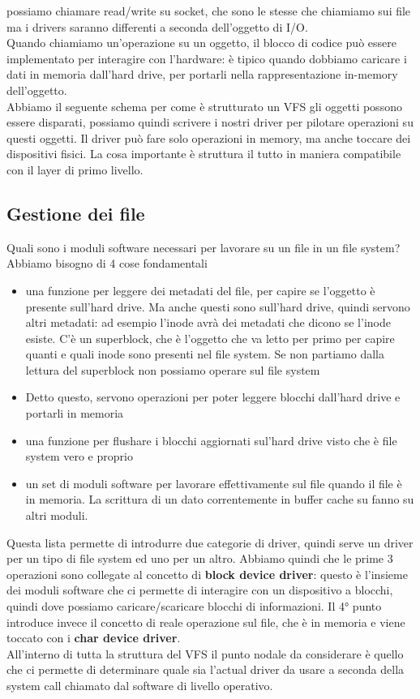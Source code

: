 \documentclass[12pt, oneside]{extbook}
\begin{document}
possiamo chiamare read/write su socket, che sono le stesse che chiamiamo sui file ma i drivers saranno differenti a seconda dell'oggetto di I/O.\\Quando chiamiamo un'operazione su un oggetto, il blocco di codice può essere implementato per interagire con l'hardware: è tipico quando dobbiamo caricare i dati in memoria dall'hard drive, per portarli nella rappresentazione in-memory dell'oggetto.\\Abbiamo il seguente schema per come è strutturato un VFS 
gli oggetti possono essere disparati, possiamo quindi scrivere i nostri driver per pilotare operazioni su questi oggetti. Il driver può fare solo operazioni in memory, ma anche toccare dei dispositivi fisici. La cosa importante è struttura il tutto in maniera compatibile con il layer di primo livello.
\subsection{Gestione dei file}
Quali sono i moduli software necessari per lavorare su un file in un file system? Abbiamo bisogno di 4 cose fondamentali
\begin{itemize}
\item una funzione per leggere dei metadati del file, per capire se l'oggetto è presente sull'hard drive. Ma anche questi sono sull'hard drive, quindi servono altri metadati: ad esempio l'inode avrà dei metadati che dicono se l'inode esiste. C'è un superblock, che è l'oggetto che va letto per primo per capire quanti e quali inode sono presenti nel file system. Se non partiamo dalla lettura del superblock non possiamo operare sul file system
\item Detto questo, servono operazioni per poter leggere blocchi dall'hard drive e portarli in memoria
\item una funzione per flushare i blocchi aggiornati sul'hard drive visto che è file system vero e proprio
\item un set di moduli software per lavorare effettivamente sul file quando il file è in memoria. La scrittura di un dato correntemente in buffer cache su fanno su altri moduli.
\end{itemize}
Questa lista permette di introdurre due categorie di driver, quindi serve un driver per un tipo di file system ed uno per un altro. Abbiamo quindi che le prime 3 operazioni sono collegate al concetto di \textbf{block device driver}: questo è l'insieme dei moduli software che ci permette di interagire con un dispositivo a blocchi, quindi dove possiamo caricare/scaricare blocchi di informazioni. Il 4° punto introduce invece il concetto di  reale operazione sul file, che è in memoria e viene toccato con i \textbf{char device driver}.\\All'interno di tutta la struttura del VFS il punto nodale da considerare è quello che ci permette di determinare quale sia l'actual driver da usare a seconda della system call chiamato dal software di livello operativo.
\end{document}
